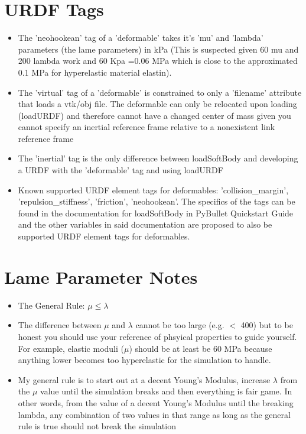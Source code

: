 \documentclass{article}
\begin{document}
\section{URDF Tags}
\begin{itemize}
    \item The 'neohookean' tag of a 'deformable' takes it's 'mu' and 'lambda' parameters (the lame parameters) in kPa (This is suspected given 60 mu and 200 lambda work and 60 Kpa =0.06 MPa which is close to the approximated 0.1 MPa for hyperelastic material elastin).
    \item The 'virtual' tag of a 'deformable' is constrained to only a 'filename' attribute that loads a vtk/obj file. The deformable can only be relocated upon loading (loadURDF) and therefore cannot have a changed center of mass given you cannot specify an inertial reference frame relative to a nonexistent link reference frame
    \item The 'inertial' tag is the only difference between loadSoftBody and developing a URDF with the 'deformable' tag and using loadURDF
    \item Known supported URDF element tags for deformables: 'collision\_margin', 'repulsion\_stiffness', 'friction', 'neohookean'. The specifics of the tags can be found in the documentation for loadSoftBody in PyBullet Quickstart Guide and the other variables in said documentation are proposed to also be supported URDF element tags for deformables.
\end{itemize}

\section{Lame Parameter Notes}
\begin{itemize}
    \item The General Rule: $\mu \leq \lambda$
    \item The difference between $\mu$ and $\lambda$ cannot be too large (e.g. $<$ 400) but to be honest you should use your reference of phsyical properties to guide yourself. For example,
    elastic moduli ($\mu$) should be at least be 60 MPa because anything lower becomes too hyperelastic for the simulation to handle.
    \item My general rule is to start out at a decent Young's Modulus, increase $\lambda$ from the $\mu$ value until the simulation breaks and then everything
    is fair game. In other words, from the value of a decent Young's Modulus until the breaking lambda, any combination of two values in that range as long as the general rule is true should not break the simulation
\end{itemize}
\end{document}
